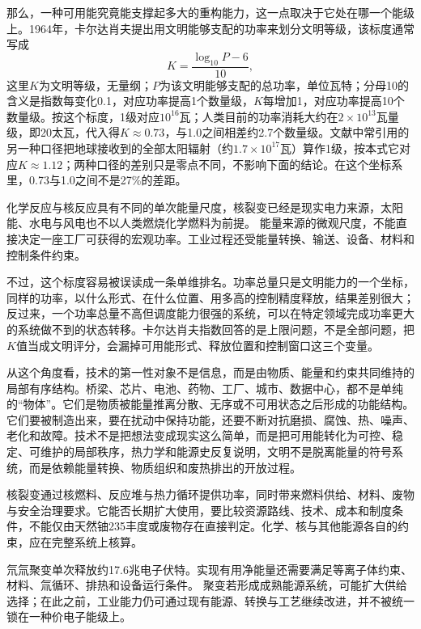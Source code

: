 那么，一种可用能究竟能支撑起多大的重构能力，这一点取决于它处在哪一个能级上。1964年，卡尔达肖夫提出用文明能够支配的功率来划分文明等级\cite{kardashev1964transmission}，该标度通常写成
\begin{equation}
K=\frac{\log_{10}P-6}{10},
\label{eq:kardashev}
\end{equation}
这里$K$为文明等级，无量纲；$P$为该文明能够支配的总功率，单位瓦特；分母10的含义是指数每变化0.1，对应功率提高1个数量级，$K$每增加1，对应功率提高10个数量级。按这个标度，1级对应$10^{16}$瓦；人类目前的功率消耗大约在$2\times10^{13}$瓦量级，即20太瓦，代入得$K\approx0.73$，与1.0之间相差约2.7个数量级。\cite{smil2017energy}文献中常引用的另一种口径把地球接收到的全部太阳辐射（约$1.7\times10^{17}$瓦）算作1级，按本式它对应$K\approx1.12$；两种口径的差别只是零点不同，不影响下面的结论。在这个坐标系里，0.73与1.0之间不是27\%的差距。

化学反应与核反应具有不同的单次能量尺度，核裂变已经是现实电力来源，太阳能、水电与风电也不以人类燃烧化学燃料为前提。\cite{jaffe2018physics} 能量来源的微观尺度，不能直接决定一座工厂可获得的宏观功率。工业过程还受能量转换、输送、设备、材料和控制条件约束。

不过，这个标度容易被误读成一条单维排名。功率总量只是文明能力的一个坐标，同样的功率，以什么形式、在什么位置、用多高的控制精度释放，结果差别很大；反过来，一个功率总量不高但调度能力很强的系统，可以在特定领域完成功率更大的系统做不到的状态转移。卡尔达肖夫指数回答的是上限问题，不是全部问题，把$K$值当成文明评分，会漏掉可用能形式、释放位置和控制窗口这三个变量。

从这个角度看，技术的第一性对象不是信息，而是由物质、能量和约束共同维持的局部有序结构。桥梁、芯片、电池、药物、工厂、城市、数据中心，都不是单纯的“物体”。它们是物质被能量推离分散、无序或不可用状态之后形成的功能结构。它们要被制造出来，要在扰动中保持功能，还要不断对抗磨损、腐蚀、热、噪声、老化和故障。技术不是把想法变成现实这么简单，而是把可用能转化为可控、稳定、可维护的局部秩序，热力学和能源史反复说明，文明不是脱离能量的符号系统，而是依赖能量转换、物质组织和废热排出的开放过程。\cite{smil2017energy,callen1985thermodynamics}


核裂变通过核燃料、反应堆与热力循环提供功率，同时带来燃料供给、材料、废物与安全治理要求。它能否长期扩大使用，要比较资源路线、技术、成本和制度条件，不能仅由天然铀235丰度或废物存在直接判定。化学、核与其他能源各自的约束，应在完整系统上核算。

氘氚聚变单次释放约17.6兆电子伏特。实现有用净能量还需要满足等离子体约束、材料、氚循环、排热和设备运行条件。\cite{atzeni2004physics} 聚变若形成成熟能源系统，可能扩大供给选择；在此之前，工业能力仍可通过现有能源、转换与工艺继续改进，并不被统一锁在一种价电子能级上。

